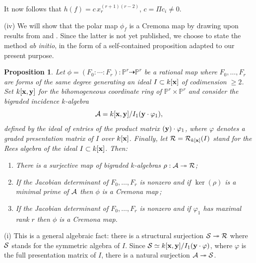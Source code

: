 \documentclass[11pt]{article}   %
\newtheorem{Proposition}[Theorem]{Proposition}
\theoremstyle{definition}
\numberwithin{Theorem}{section} \numberwithin{equation}{section}
\def\demo{\noindent{\it Proof. }}
\newcommand{\xx}{{\bf x}}
\newcommand{\yy}{{\bf y}}
\newcommand{\p}{{\mathbb P}}
\def\surjects{\twoheadrightarrow}
\begin{document}
{It now follows that $h(f)=c\,x_r^ {(r+1)(r-2)}$, $c=\Pi c_i\neq 0$.

\medskip


(iv) We will show that the polar map $\phi_f$ is a Cremona map by
drawing upon results from \cite{Simis2} and \cite{cremona2}. Since
the latter is not yet published, we choose to state the method {\it
ab initio}, in the form of a self-contained proposition adapted to
our present purpose.
\medskip


\begin{Proposition}\label{maxrank_is_cremona}
Let $\phi=(F_0:\cdots :F_r)\colon\p^r\dasharrow \p^r$ be a rational
map where $F_0,\ldots ,F_r$ are forms of the same degree generating
an ideal $I\subset k[\xx]$ of codimension $\geq 2$. Set $k[\xx,\yy]$
for the bihomogeneous coordinate ring of $\p^r\times \p^r$ and
consider the bigraded incidence $k$-algebra
$${\cal A}=k[\xx,\yy]/I_1(\yy\cdot\varphi_1),$$
defined by the ideal of entries of the product matrix
$(\yy)\cdot\varphi_1$, where $\varphi$ denotes a graded presentation
matrix of $I$ over $k[\xx]$. Finally, let ${\cal R}={\cal
R}_{k[\xx]}(I)$ stand for the Rees algebra of the ideal $I\subset
k[\xx]$. Then:
\begin{enumerate}
\item[{\rm (i)}] There is a surjective map of bigraded $k$-algebras
$\rho:{\cal A}\surjects {\cal R}${\rm ;}
\item[{\rm (ii)}] If the Jacobian determinant of $F_0,\ldots ,F_r$
is nonzero and if $\ker(\rho)$ is a minimal prime of ${\cal A}$ then
$\phi$ is a Cremona map{\rm $\,$;}
\item[{\rm (iii)}] If the Jacobian determinant of $F_0,\ldots ,F_r$
is nonzero and if $\varphi_1$ has maximal rank  $r$ then $\phi$ is a
Cremona map.
\end{enumerate}
\end{Proposition}
\demo (i) This is a general algebraic fact: there is a structural
surjection ${\cal S}\surjects {\cal R}$ where ${\cal S}$ stands for
the symmetric algebra of $I$. Since ${\cal S}\simeq
k[\xx,\yy]/I_1(\yy\cdot\varphi)$, where $\varphi$ is the full
presentation matrix of $I$, there is a natural surjection ${\cal
A}\surjects {\cal S}$.


}
\end{document}

